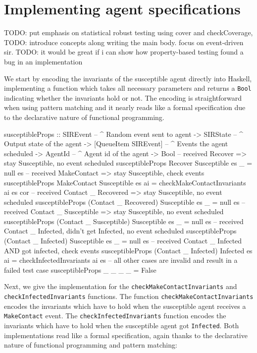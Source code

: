 \section{Implementing agent specifications}
\label{sec:method}
TODO: put emphasis on statistical robust testing using cover and checkCoverage,
TODO: introduce concepts along writing the main body. focus on event-driven sir.
TODO: it would be great if i can show how property-based testing found a bug in an implementation

We start by encoding the invariants of the susceptible agent directly into Haskell, implementing a function which takes all necessary parameters and returns a \texttt{Bool} indicating whether the invariants hold or not. The encoding is straightforward when using pattern matching and it nearly reads like a formal specification due to the declarative nature of functional programming.

\begin{HaskellCode}
susceptibleProps :: SIREvent              -- ^ Random event sent to agent
                 -> SIRState              -- ^ Output state of the agent
                 -> [QueueItem SIREvent]  -- ^ Events the agent scheduled
                 -> AgentId               -- ^ Agent id of the agent
                 -> Bool
-- received Recover => stay Susceptible, no event scheduled
susceptibleProps Recover Susceptible es _ = null es
-- received MakeContact => stay Susceptible, check events
susceptibleProps MakeContact Susceptible es ai
  = checkMakeContactInvariants ai es cor 
-- received Contact _ Recovered => stay Susceptible, no event scheduled
susceptibleProps (Contact _ Recovered) Susceptible es _ = null es
-- received Contact _ Susceptible => stay Susceptible, no event scheduled
susceptibleProps (Contact _ Susceptible) Susceptible es _  = null es
-- received Contact _ Infected, didn't get Infected, no event scheduled
susceptibleProps (Contact _ Infected) Susceptible es _ = null es
-- received Contact _ Infected AND got infected, check events
susceptibleProps (Contact _ Infected) Infected es ai
  = checkInfectedInvariants ai es
-- all other cases are invalid and result in a failed test case
susceptibleProps _ _ _ _ = False
\end{HaskellCode}

Next, we give the implementation for the \texttt{checkMakeContactInvariants} and \texttt{checkInfectedInvariants} functions. The function \texttt{checkMakeContactInvariants} encodes the invariants which have to hold when the susceptible agent receives a \texttt{MakeContact} event. The \texttt{checkInfectedInvariants} function encodes the invariants which have to hold when the susceptible agent got \texttt{Infected}. Both implementations read like a formal specification, again thanks to the declarative nature of functional programming and pattern matching:

